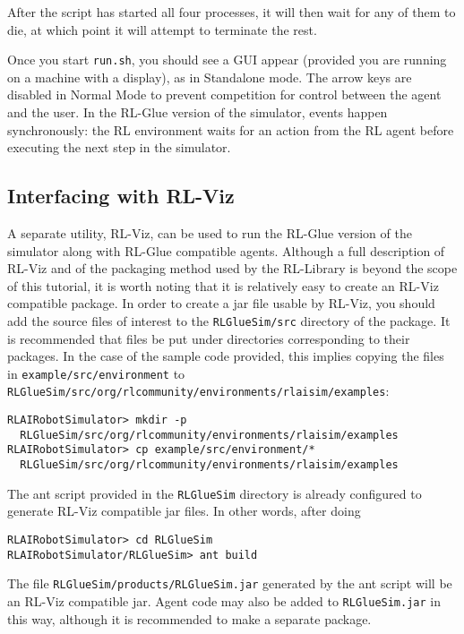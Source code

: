 \documentclass[12pt]{article}
\newcommand{\code}[1]{\texttt{#1}}
\begin{document}
After the script has started all four processes, it will then wait
for any of them to die, at which point it will attempt to terminate the rest. 

Once you start \verb+run.sh+, you should see a GUI appear (provided you are
running on a machine with a display), as in Standalone mode.
The arrow keys are disabled in Normal Mode to prevent competition for control 
between the agent and the user. In the RL-Glue version of the simulator,
events happen synchronously: the RL environment waits for an action from the
RL agent before executing the next step in the simulator.

\subsection{Interfacing with RL-Viz}

A separate utility, RL-Viz, can be used to run the RL-Glue version of the
simulator along with RL-Glue compatible agents. Although a full description
of RL-Viz and of the packaging method used by the RL-Library is beyond the 
scope of this tutorial, it is worth noting that it is relatively easy to 
create an RL-Viz compatible package.
In order to create a jar file usable by RL-Viz, you should add the
source files of interest to the \code{RLGlueSim/src} directory of the package.
It is recommended that files be put under directories corresponding to their
packages. In the case of the sample code provided, this implies copying the
files in \code{example/src/environment} to 
\code{RLGlueSim/src/org/rlcommunity/environments/rlaisim/examples}:

\begin{verbatim}
RLAIRobotSimulator> mkdir -p 
  RLGlueSim/src/org/rlcommunity/environments/rlaisim/examples
RLAIRobotSimulator> cp example/src/environment/* 
  RLGlueSim/src/org/rlcommunity/environments/rlaisim/examples
\end{verbatim}

The ant script provided in the \code{RLGlueSim} directory is already configured 
to generate RL-Viz compatible jar files. In other words, after doing

\begin{verbatim}
RLAIRobotSimulator> cd RLGlueSim
RLAIRobotSimulator/RLGlueSim> ant build
\end{verbatim}

The file \code{RLGlueSim/products/RLGlueSim.jar} generated by the ant script
will be an RL-Viz compatible jar. Agent code may also be added to 
\code{RLGlueSim.jar} in this way, although it is recommended to make a separate
package.
\end{document}
